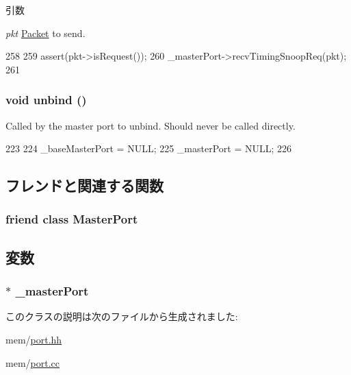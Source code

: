 \begin{DoxyParams}{引数}
\item[{\em pkt}]\hyperlink{classPacket}{Packet} to send. \end{DoxyParams}



\begin{DoxyCode}
258 {
259     assert(pkt->isRequest());
260     _masterPort->recvTimingSnoopReq(pkt);
261 }
\end{DoxyCode}
\hypertarget{classSlavePort_af294915156f1e30f1d2e574dccc87945}{
\subsubsection[{unbind}]{\setlength{\rightskip}{0pt plus 5cm}void unbind ()}}
\label{classSlavePort_af294915156f1e30f1d2e574dccc87945}
Called by the master port to unbind. Should never be called directly. 


\begin{DoxyCode}
223 {
224     _baseMasterPort = NULL;
225     _masterPort = NULL;
226 }
\end{DoxyCode}


\subsection{フレンドと関連する関数}
\hypertarget{classSlavePort_a6c830d413286a218b881eaca621285e4}{
\subsubsection[{MasterPort}]{\setlength{\rightskip}{0pt plus 5cm}friend class {\bf MasterPort}}}
\label{classSlavePort_a6c830d413286a218b881eaca621285e4}


\subsection{変数}
\hypertarget{classSlavePort_a5e0f39f8e39e5b4c3dcf0991c627489b}{
\subsubsection[{\_\-masterPort}]{$\ast$ {\bf \_\-masterPort}}}
\label{classSlavePort_a5e0f39f8e39e5b4c3dcf0991c627489b}


このクラスの説明は次のファイルから生成されました:\begin{DoxyCompactItemize}
\item 
mem/\hyperlink{port_8hh}{port.hh}\item 
mem/\hyperlink{port_8cc}{port.cc}\end{DoxyCompactItemize}
